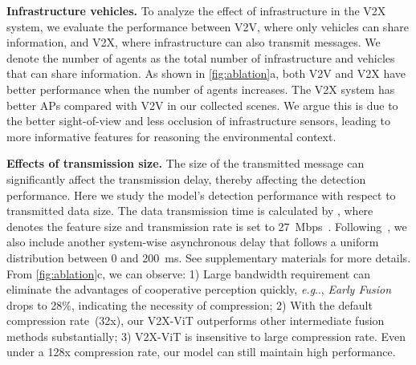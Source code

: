 \documentclass[runningheads]{llncs}
\makeatletter
\DeclareRobustCommand\onedot{\futurelet\@let@token\@onedot}
\def\@onedot{\ifx\@let@token.\else.\null\fi\xspace}
\def\eg{\emph{e.g}\onedot} \def\Eg{\emph{E.g}\onedot}
\makeatother
\begin{document}
\noindent\textbf{Infrastructure \vs vehicles. }To analyze the effect of infrastructure in the V2X system, we evaluate the performance between V2V, where only vehicles can share information, and V2X, where infrastructure can also transmit messages. We denote the number of agents as the total number of infrastructure and vehicles that can share information.
As shown in \cref{fig:ablation}a, both V2V and V2X have better performance when the number of agents increases. The V2X system has better APs compared with V2V in our collected scenes. We argue this is due to the better sight-of-view and less occlusion of infrastructure sensors, leading to more informative features for reasoning the environmental context. 

\noindent\textbf{Effects of transmission size.}
The size of the transmitted message can significantly affect the transmission delay, thereby affecting the detection performance. Here we study the model's detection performance with respect to transmitted data size. The data transmission time is calculated by  ,  where  denotes the feature size and transmission rate  is set to 27~Mbps~\cite{arena2019overview}.  Following~\cite{rauch2011analysis}, we also include another system-wise asynchronous delay that follows a uniform distribution between 0 and 200~ms. See supplementary materials for more details.  From \cref{fig:ablation}c, we can observe: 1) Large bandwidth requirement can eliminate the advantages of cooperative perception quickly, \eg, \textit{Early Fusion} drops to 28\%, indicating the necessity of compression; 2) With the default compression rate~(32x), our V2X-ViT outperforms other intermediate fusion methods substantially; 3) V2X-ViT is insensitive to large compression rate. Even under a 128x compression rate, our model can still maintain high performance.
\end{document}
